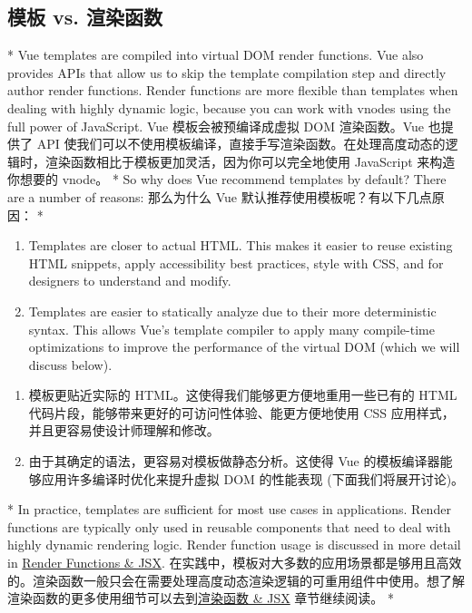 \begin{paracol}{2}
\subsection{模板 vs. 渲染函数}
\switchcolumn[0]*%
Vue templates are compiled into virtual DOM render functions. Vue also
provides APIs that allow us to skip the template compilation step and
directly author render functions. Render functions are more flexible
than templates when dealing with highly dynamic logic, because you can
work with vnodes using the full power of JavaScript.
\switchcolumn
Vue 模板会被预编译成虚拟 DOM 渲染函数。Vue 也提供了 API
使我们可以不使用模板编译，直接手写渲染函数。在处理高度动态的逻辑时，渲染函数相比于模板更加灵活，因为你可以完全地使用
JavaScript 来构造你想要的 vnode。
\switchcolumn[0]*%
So why does Vue recommend templates by default? There are a number of
reasons:
\switchcolumn
那么为什么 Vue 默认推荐使用模板呢？有以下几点原因：
\switchcolumn[0]*%
\begin{enumerate}
\def\labelenumi{\arabic{enumi}.}
\item
  Templates are closer to actual HTML. This makes it easier to reuse
  existing HTML snippets, apply accessibility best practices, style with
  CSS, and for designers to understand and modify.
\item
  Templates are easier to statically analyze due to their more
  deterministic syntax. This allows Vue's template compiler to apply
  many compile-time optimizations to improve the performance of the
  virtual DOM (which we will discuss below).
\end{enumerate}
\switchcolumn
\begin{enumerate}
\def\labelenumi{\arabic{enumi}.}
\item
  模板更贴近实际的 HTML。这使得我们能够更方便地重用一些已有的 HTML
  代码片段，能够带来更好的可访问性体验、能更方便地使用 CSS
  应用样式，并且更容易使设计师理解和修改。
\item
  由于其确定的语法，更容易对模板做静态分析。这使得 Vue
  的模板编译器能够应用许多编译时优化来提升虚拟 DOM 的性能表现
  (下面我们将展开讨论)。
\end{enumerate}
\switchcolumn[0]*%
In practice, templates are sufficient for most use cases in
applications. Render functions are typically only used in reusable
components that need to deal with highly dynamic rendering logic. Render
function usage is discussed in more detail in
\href{https://vuejs.org/guide/extras/render-function.html}{Render
Functions \& JSX}.
\switchcolumn
在实践中，模板对大多数的应用场景都是够用且高效的。渲染函数一般只会在需要处理高度动态渲染逻辑的可重用组件中使用。想了解渲染函数的更多使用细节可以去到\href{https://cn.vuejs.org/guide/extras/render-function.html}{渲染函数
\& JSX} 章节继续阅读。
\switchcolumn[0]*%

\end{paracol}
